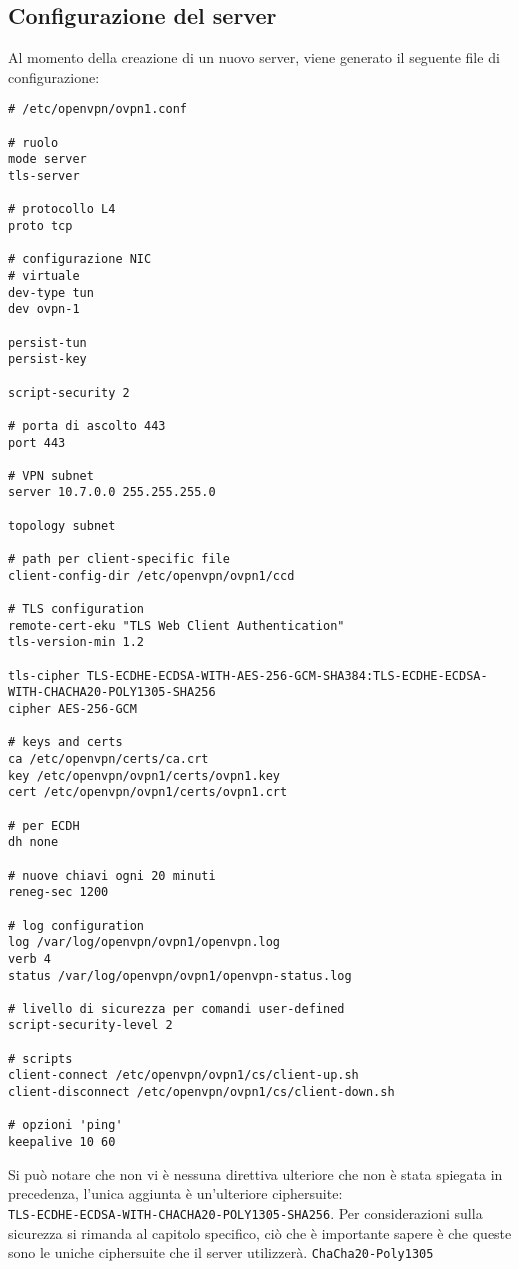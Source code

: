 \subsection{Configurazione del server}
Al momento della creazione di un nuovo server, viene generato il seguente file
di configurazione:
\begin{verbatim}
# /etc/openvpn/ovpn1.conf

# ruolo
mode server
tls-server

# protocollo L4
proto tcp

# configurazione NIC
# virtuale
dev-type tun
dev ovpn-1

persist-tun
persist-key

script-security 2

# porta di ascolto 443
port 443

# VPN subnet
server 10.7.0.0 255.255.255.0

topology subnet

# path per client-specific file
client-config-dir /etc/openvpn/ovpn1/ccd

# TLS configuration
remote-cert-eku "TLS Web Client Authentication"
tls-version-min 1.2

tls-cipher TLS-ECDHE-ECDSA-WITH-AES-256-GCM-SHA384:TLS-ECDHE-ECDSA-WITH-CHACHA20-POLY1305-SHA256
cipher AES-256-GCM

# keys and certs
ca /etc/openvpn/certs/ca.crt
key /etc/openvpn/ovpn1/certs/ovpn1.key
cert /etc/openvpn/ovpn1/certs/ovpn1.crt

# per ECDH
dh none

# nuove chiavi ogni 20 minuti
reneg-sec 1200

# log configuration
log /var/log/openvpn/ovpn1/openvpn.log
verb 4
status /var/log/openvpn/ovpn1/openvpn-status.log

# livello di sicurezza per comandi user-defined
script-security-level 2

# scripts
client-connect /etc/openvpn/ovpn1/cs/client-up.sh
client-disconnect /etc/openvpn/ovpn1/cs/client-down.sh

# opzioni 'ping'
keepalive 10 60
\end{verbatim}
Si può notare che non vi è nessuna direttiva ulteriore che non è stata spiegata in
precedenza, l'unica aggiunta è un'ulteriore ciphersuite:\\
\texttt{TLS-ECDHE-ECDSA-WITH-CHACHA20-POLY1305-SHA256}. Per considerazioni sulla
sicurezza si rimanda al capitolo specifico, ciò che è importante sapere è che
queste sono le uniche ciphersuite che il server utilizzerà. \texttt{ChaCha20-Poly1305}
